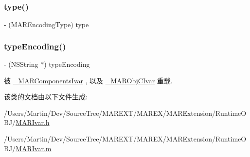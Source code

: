 \mbox{\label{interface_m_a_r_ivar_ad7448d482c83c03015e0037578516af1}} 
\subsubsection{\texorpdfstring{type()}{type()}}
{\footnotesize\ttfamily -\/ (M\+A\+R\+Encoding\+Type) type \begin{DoxyParamCaption}{ }\end{DoxyParamCaption}}

\mbox{\label{interface_m_a_r_ivar_a8e78dbba396310694769832c7e82d27d}} 
\subsubsection{\texorpdfstring{type\+Encoding()}{typeEncoding()}}
{\footnotesize\ttfamily -\/ (N\+S\+String $\ast$) type\+Encoding \begin{DoxyParamCaption}{ }\end{DoxyParamCaption}}



被 \hyperlink{interface___m_a_r_components_ivar_acccf7268cb3cbc4c1d9f679525027ece}{\+\_\+\+M\+A\+R\+Components\+Ivar} , 以及 \hyperlink{interface___m_a_r_obj_c_ivar_ad2feb85addee2dd039ded28972747c0c}{\+\_\+\+M\+A\+R\+Obj\+C\+Ivar} 重载.



该类的文档由以下文件生成\+:\begin{DoxyCompactItemize}
\item 
/\+Users/\+Martin/\+Dev/\+Source\+Tree/\+M\+A\+R\+E\+X\+T/\+M\+A\+R\+E\+X/\+M\+A\+R\+Extension/\+Runtime\+O\+B\+J/\hyperlink{_m_a_r_ivar_8h}{M\+A\+R\+Ivar.\+h}\item 
/\+Users/\+Martin/\+Dev/\+Source\+Tree/\+M\+A\+R\+E\+X\+T/\+M\+A\+R\+E\+X/\+M\+A\+R\+Extension/\+Runtime\+O\+B\+J/\hyperlink{_m_a_r_ivar_8m}{M\+A\+R\+Ivar.\+m}\end{DoxyCompactItemize}
